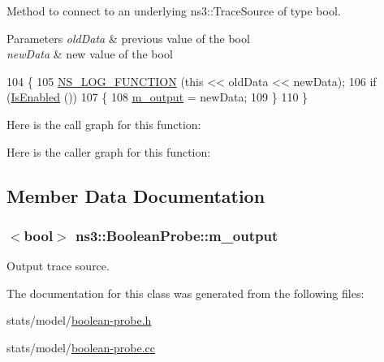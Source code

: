 Method to connect to an underlying ns3\+::\+Trace\+Source of type bool. 


\begin{DoxyParams}{Parameters}
{\em old\+Data} & previous value of the bool \\
\hline
{\em new\+Data} & new value of the bool \\
\hline
\end{DoxyParams}

\begin{DoxyCode}
104 \{
105   \hyperlink{log-macros-disabled_8h_a90b90d5bad1f39cb1b64923ea94c0761}{NS\_LOG\_FUNCTION} (\textcolor{keyword}{this} << oldData << newData);
106   \textcolor{keywordflow}{if} (\hyperlink{classns3_1_1Probe_a201d605485aaa1c96b973656d6eb56eb}{IsEnabled} ())
107     \{
108       \hyperlink{classns3_1_1BooleanProbe_a19ccb2d24152ccb48e310f084da2a590}{m\_output} = newData;
109     \}
110 \}
\end{DoxyCode}


Here is the call graph for this function\+:




Here is the caller graph for this function\+:




\subsection{Member Data Documentation}
\subsubsection[{\texorpdfstring{m\+\_\+output}{m_output}}]{$<$bool$>$ ns3\+::\+Boolean\+Probe\+::m\+\_\+output\hspace{0.3cm}{\ttfamily [private]}}\hypertarget{classns3_1_1BooleanProbe_a19ccb2d24152ccb48e310f084da2a590}{}\label{classns3_1_1BooleanProbe_a19ccb2d24152ccb48e310f084da2a590}


Output trace source. 



The documentation for this class was generated from the following files\+:\begin{DoxyCompactItemize}
\item 
stats/model/\hyperlink{boolean-probe_8h}{boolean-\/probe.\+h}\item 
stats/model/\hyperlink{boolean-probe_8cc}{boolean-\/probe.\+cc}\end{DoxyCompactItemize}
